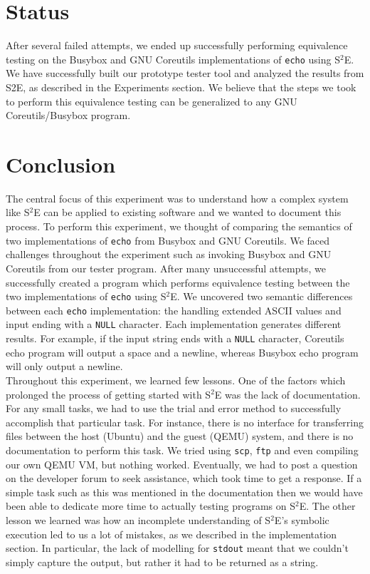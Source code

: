\documentclass[conference]{IEEEtran}
\begin{document}

\section{Status}

After several failed attempts, we ended up successfully performing equivalence testing on the Busybox and GNU Coreutils implementations of {\tt echo} using S$^2$E. We have successfully built our prototype tester tool and analyzed the results from S2E, as described in the Experiments section. We believe that the steps we took to perform this equivalence testing can be generalized to any GNU Coreutils/Busybox program. 


\section{Conclusion}

The central focus of this experiment was to understand how a complex system like S$^2$E can be applied to existing software and we wanted to document this process. To perform this experiment, we thought of comparing the semantics of two implementations of {\tt echo} from Busybox and GNU Coreutils. We faced challenges throughout the experiment such as invoking Busybox and GNU Coreutils from our tester program. After many unsuccessful attempts, we successfully created a program which performs equivalence testing between the two implementations of {\tt echo} using S$^2$E. We uncovered two semantic differences between each {\tt echo} implementation: the handling extended ASCII values and input ending with a {\tt NULL} character. Each implementation generates different results. For example, if the input string ends with  a {\tt NULL} character, Coreutils echo program will output a space and a newline, whereas Busybox echo program will only output a newline. \\

Throughout this experiment, we learned few lessons. One of the factors which prolonged the process of getting started with S$^2$E was the lack of documentation. For any small tasks, we had to use the trial and error method to successfully accomplish that particular task. For instance, there is no interface for transferring files between the host (Ubuntu) and the guest (QEMU) system, and there is no documentation to perform this task. We tried using {\tt scp}, {\tt ftp} and even compiling our own QEMU VM, but nothing worked. Eventually, we had to post a question on the developer forum to seek assistance, which took time to get a response. If a simple task such as this was mentioned in the documentation then we would have been able to dedicate more time to actually testing programs on S$^2$E. The other lesson we learned was how an incomplete understanding of S$^2$E's symbolic execution led to us a lot of mistakes, as we described in the implementation section. In particular, the lack of modelling for {\tt stdout} meant that we couldn't simply capture the output, but rather it had to be returned as a string. 
\end{document}
